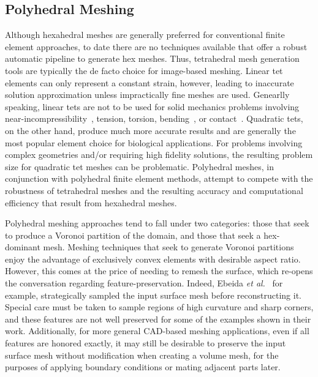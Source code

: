 \subsection{Polyhedral Meshing}
\label{Polyhedral Meshing}

Although hexahedral meshes are generally preferred for conventional finite element approaches, to date there are no techniques available that offer a robust automatic pipeline to generate hex meshes. Thus, tetrahedral mesh generation tools are typically the de facto choice for image-based meshing. Linear tet elements can only represent a constant strain, however, leading to inaccurate solution approximation unless impractically fine meshes are used. Genearlly speaking, linear tets are not to be used for solid mechanics problems involving near-incompressibility~\cite{hughes_2007}, tension, torsion, bending~\cite{wang_2004, benzley_1995}, or contact~\cite{maas_2016}. Quadratic tets, on the other hand, produce much more accurate results and are generally the most popular element choice for biological applications. For problems involving complex geometries and/or requiring high fidelity solutions, the resulting problem size for quadratic tet meshes can be problematic. Polyhedral meshes, in conjunction with polyhedral finite element methods, attempt to compete with the robustness of tetrahedral meshes and the resulting accuracy and computational efficiency that result from hexahedral meshes.

Polyhedral meshing approaches tend to fall under two categories: those that seek to produce a Voronoi partition of the domain, and those that seek a hex-dominant mesh. Meshing techniques that seek to generate Voronoi partitions~\cite{garimella_2014, lee_2015} enjoy the advantage of exclusively convex elements with desirable aspect ratio. However, this comes at the price of needing to remesh the surface, which re-opens the conversation regarding feature-preservation. Indeed, Ebeida \textit{et al.}~\cite{ebeida_2011, mitchell_2015} for example, strategically sampled the input surface mesh before reconstructing it. Special care must be taken to sample regions of high curvature and sharp corners, and these features are not well preserved for some of the examples shown in their work. Additionally, for more general CAD-based meshing applications, even if all features are honored exactly, it may still be desirable to preserve the input surface mesh without modification when creating a volume mesh, for the purposes of applying boundary conditions or mating adjacent parts later.

